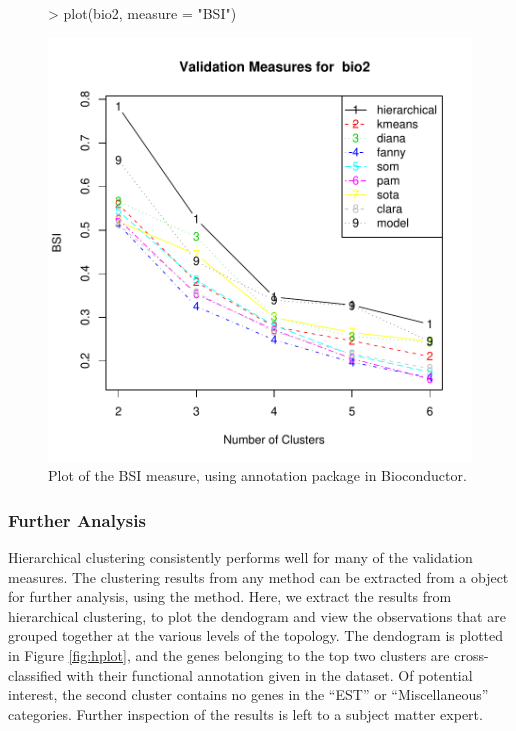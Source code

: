 \documentclass[11pt]{article}
\begin{document}
\begin{figure}
  \centering
\begin{Schunk}
\begin{Sinput}
> plot(bio2, measure = "BSI")
\end{Sinput}
\end{Schunk}
\includegraphics{clValid-022}
  \caption{Plot of the BSI measure, using annotation package
     in Bioconductor.}
  \label{fig:BSI2}
\end{figure}




\subsubsection*{Further Analysis}

Hierarchical clustering consistently performs well for many of the
validation measures. The clustering results from any method can be
extracted from a  object for further analysis, using the
 method.  Here, we
extract the results from hierarchical clustering, to plot the
dendogram and view the observations that are grouped together at the
various levels of the topology.  The dendogram is plotted in Figure
\ref{fig:hplot}, and the genes belonging to the top two clusters are
cross-classified with their functional annotation given in the
dataset. Of potential interest, the second cluster contains no
genes in the ``EST'' or ``Miscellaneous'' categories.  Further
inspection of the results is left to a subject matter expert.  
\end{document}
